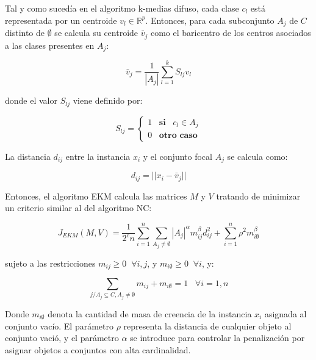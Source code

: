Tal y como sucedía en el algoritmo k-medias difuso, cada clase $c_l$ está representada por un centroide $v_l \in \mathbb{R}^p$. Entonces, para cada subconjunto $A_j$ de $C$ distinto de $\emptyset$ se calcula su centroide $\bar{v}_j$ como el baricentro de los centros asociados a las clases presentes en $A_j$:

\begin{equation}
\bar{v}_j = \frac{1}{|A_j|} \sum_{l=1}^{k} S_{lj} v_l
\label{eqn11}
\end{equation}

donde el valor $S_{lj}$ viene definido por:

\begin{equation}
S_{lj} = \begin{cases}
1 \;\;\; \textbf{si} \;\;\; c_l \in A_j\\
0 \;\;\; \textbf{otro caso}
\end{cases}
\label{eqn12}
\end{equation}

La distancia $d_{ij}$ entre la instancia $x_i$ y el conjunto focal $A_j$ se calcula como:

\begin{equation}
d_{ij} = ||x_i - \bar{v}_j||
\label{eqn13}
\end{equation}

Entonces, el algoritmo \acs{EKM} calcula las matrices $M$ y $V$ tratando de minimizar un criterio similar al del algoritmo \acs{NC}:

\begin{equation}
J_{EKM}(M,V) = \frac{1}{2^cn} \sum_{i=1}^{n}\sum_{A_j \neq \emptyset} |A_j|^\alpha m_{ij}^\beta d_{ij}^2 + \sum_{i=1}^{n} \rho^2 m_{i\emptyset}^\beta
\label{eqn14}
\end{equation}

sujeto a las restricciones $m_{ij} \ge 0 \;\; \forall i,j$, y $m_{i\emptyset} \ge 0 \;\; \forall i$, y:

\begin{equation}
\sum_{j/A_j \subseteq C, A_j \neq \emptyset} m_{ij} + m_{i\emptyset} = 1 \;\;\; \forall i = 1,n
\label{eqn15}
\end{equation}

Donde $m_{i\emptyset}$ denota la cantidad de masa de creencia de la instancia $x_i$ asignada al conjunto vacío. El parámetro $\rho$ representa la distancia de cualquier objeto al conjunto vació, y el parámetro $\alpha$ se introduce para controlar la penalización por asignar objetos a conjuntos con alta cardinalidad.

